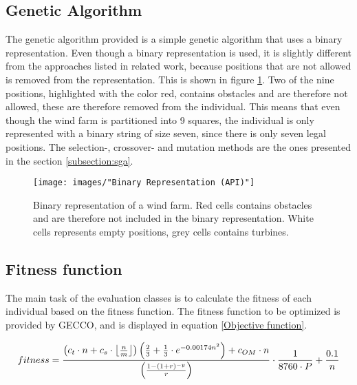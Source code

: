 \subsection{Genetic Algorithm}
The genetic algorithm provided is a simple genetic algorithm that uses a binary representation. Even though a binary representation is used, it is slightly different from the approaches listed in related work, because positions that are not allowed is removed from the representation. This is shown in figure \ref{Binary Representation (API)}. Two of the nine positions, highlighted with the color red, contains obstacles and are therefore not allowed, these are therefore removed from the individual. This means that even though the wind farm is partitioned into 9 squares, the individual is only represented with a binary string of size seven, since there is only seven legal positions. The selection-, crossover- and mutation methods are the ones presented in the section \ref{subsection:sga}.


\begin{figure}[h!]
\begin{center}
\texttt{[image: images/"Binary Representation (API)"]}
\caption{Binary representation of a wind farm. Red cells contains obstacles and are therefore not included in the binary representation. White cells represents empty positions, grey cells contains turbines.}
\label{Binary Representation (API)}
\end{center}
\end{figure}


\subsection{Fitness function}\label{subsection:fitnessfunction}


The main task of the evaluation classes is to calculate the fitness of each individual based on the fitness function.  The fitness function to be optimized is provided by GECCO, and is displayed in equation \ref{Objective function}.\\

\begin{small}
\begin{equation}
fitness =  \frac{ \left( c_t \cdot n + c_s \cdot \floor*{\frac{n}{m}} \right) \left( \frac{2}{3} + \frac{1}{3} \cdot e^{-0.00174n^2} \right) + c_{OM} \cdot n}{\left( \frac{1 - (1 + r)^{-y}}{r} \right) } \cdot \frac{1}{8760 \cdot P} + \frac{0.1}{n}
\label{Objective function} 
\end{equation}
\end{small}


